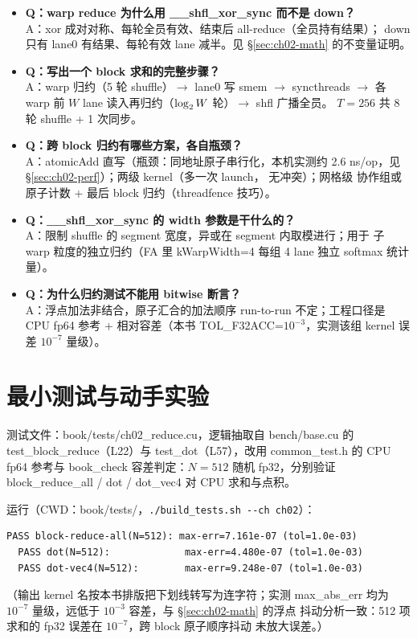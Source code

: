 \begin{itemize}
\item \textbf{Q：warp reduce 为什么用 \_\_shfl\_xor\_sync 而不是 down？}\\
  A：xor 成对对称、每轮全员有效、结束后 all-reduce（全员持有结果）；
  down 只有 lane0 有结果、每轮有效 lane 减半。见 \S\ref{sec:ch02-math}
  的不变量证明。
\item \textbf{Q：写出一个 block 求和的完整步骤？}\\
  A：warp 归约（5 轮 shuffle）$\to$ lane0 写 smem $\to$ syncthreads $\to$
  各 warp 前 $W$ lane 读入再归约（$\log\sb 2 W$ 轮）$\to$ shfl 广播全员。
  $T=256$ 共 8 轮 shuffle + 1 次同步。
\item \textbf{Q：跨 block 归约有哪些方案，各自瓶颈？}\\
  A：atomicAdd 直写（瓶颈：同地址原子串行化，本机实测约
  2.6 ns/op，见 \S\ref{sec:ch02-perf}）；两级 kernel（多一次 launch，
  无冲突）；网格级
  协作组或原子计数 + 最后 block 归约（threadfence 技巧）。
\item \textbf{Q：\_\_shfl\_xor\_sync 的 width 参数是干什么的？}\\
  A：限制 shuffle 的 segment 宽度，异或在 segment 内取模进行；用于
  子 warp 粒度的独立归约（FA 里 kWarpWidth=4 每组 4 lane 独立 softmax
  统计量）。
\item \textbf{Q：为什么归约测试不能用 bitwise 断言？}\\
  A：浮点加法非结合，原子汇合的加法顺序 run-to-run 不定；工程口径是
  CPU fp64 参考 + 相对容差（本书 TOL\_F32ACC=$10^{-3}$，实测该组 kernel
  误差 $10^{-7}$ 量级）。
\end{itemize}

\section{最小测试与动手实验}

测试文件：book/tests/ch02\_reduce.cu，逻辑抽取自 bench/base.cu 的
test\_block\_reduce（L22）与 test\_dot（L57），改用 common\_test.h 的
CPU fp64 参考与 book\_check 容差判定：$N = 512$ 随机 fp32，分别验证
block\_reduce\_all / dot / dot\_vec4 对 CPU 求和与点积。

运行（CWD：book/tests/，\texttt{.\allowbreak{}/\allowbreak{}build\_\allowbreak{}tests.\allowbreak{}sh -{}-ch ch02}）：
\begin{lstlisting}[style=console]
  PASS block-reduce-all(N=512): max-err=7.161e-07 (tol=1.0e-03)
  PASS dot(N=512):             max-err=4.480e-07 (tol=1.0e-03)
  PASS dot-vec4(N=512):        max-err=9.248e-07 (tol=1.0e-03)
\end{lstlisting}
（输出 kernel 名按本书排版把下划线转写为连字符；实测 max\_abs\_err 均为
$10^{-7}$ 量级，远低于 $10^{-3}$ 容差，与 \S\ref{sec:ch02-math} 的浮点
抖动分析一致：512 项求和的 fp32 误差在 $10^{-7}$，跨 block 原子顺序抖动
未放大误差。）

